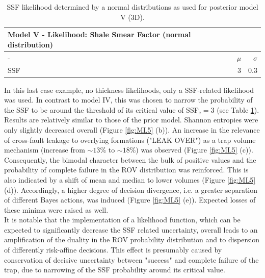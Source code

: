 		\begin{table}[h]
			\centering
			\begin{tabular}{lrr} 
				\toprule
				Model V - Likelihood: Shale Smear Factor (normal distribution)\\
				\midrule
				- & $\mu$ & $\sigma$\\
				\midrule
				SSF & 3 & 0.3\\
				\bottomrule
			\end{tabular}
			\caption{SSF likelihood determined by a normal distributions as used for posterior model V (3D).}
			\label{tab:ML5_likelihoods}
		\end{table}
		In this last case example, no thickness likelihoods, only a SSF-related likelihood was used. In contrast to model IV, this was chosen to narrow the probability of the SSF to be around the threshold of its critical value of SSF$_\text{c} = 3$ (see Table \ref{tab:ML5_likelihoods}).\\
		Results are relatively similar to those of the prior model. Shannon entropies were only slightly decreased overall (Figure \ref{fig:ML5} (b)). An increase in the relevance of cross-fault leakage to overlying formations ("LEAK OVER") as a trap volume mechanism (increase from $\sim13\%$ to $\sim18\%$) was observed (Figure \ref{fig:ML5} (c)). Consequently, the bimodal character between the bulk of positive values and the probability of complete failure in the ROV distribution was reinforced. This is also indicated by a shift of mean and median to lower volumes (Figure \ref{fig:ML5} (d)). Accordingly, a higher degree of decision divergence, i.e. a greater separation of different Bayes actions, was induced (Figure \ref{fig:ML5} (e)). Expected losses of these minima were raised as well.\\
		It is notable that the implementation of a likelihood function, which can be expected to significantly decrease the SSF related uncertainty, overall leads to an amplification of the duality in the ROV probability distribution and to dispersion of differently risk-affine decisions. This effect is presumably caused by conservation of decisive uncertainty between "success" and complete failure of the trap, due to narrowing of the SSF probability around its critical value. 
